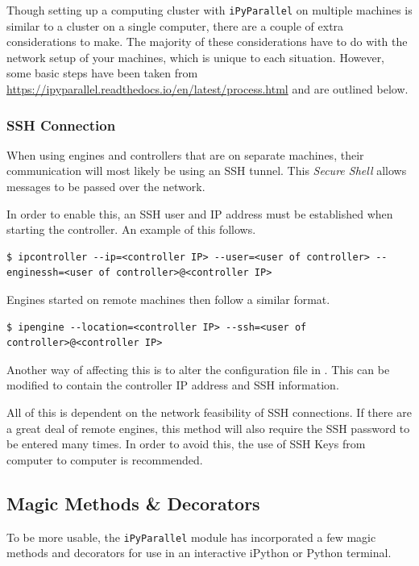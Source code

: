 Though setting up a computing cluster with \texttt{iPyParallel} on multiple machines is similar to a cluster on a single computer, there are a couple of extra considerations to make.
The majority of these considerations have to do with the network setup of your machines, which is unique to each situation.
However, some basic steps have been taken from \url{https://ipyparallel.readthedocs.io/en/latest/process.html} and are outlined below.

\subsubsection*{SSH Connection}
When using engines and controllers that are on separate machines, their communication will most likely be using an SSH tunnel.
This \emph{Secure Shell} allows messages to be passed over the network.

In order to enable this, an SSH user and IP address must be established when starting the controller.
An example of this follows.

\begin{lstlisting}[style=ShellInput]
$ ipcontroller --ip=<controller IP> --user=<user of controller> --enginessh=<user of controller>@<controller IP>
\end{lstlisting}

Engines started on remote machines then follow a similar format.

\begin{lstlisting}[style=ShellInput]
$ ipengine --location=<controller IP> --ssh=<user of controller>@<controller IP>
\end{lstlisting}

Another way of affecting this is to alter the configuration file in .
This can be modified to contain the controller IP address and SSH information.

All of this is dependent on the network feasibility of SSH connections.
If there are a great deal of remote engines, this method will also require the SSH password to be entered many times.
In order to avoid this, the use of SSH Keys from computer to computer is recommended.


\subsection*{Magic Methods \& Decorators}
To be more usable, the \texttt{iPyParallel} module has incorporated a few magic methods and decorators for use in an interactive iPython or Python terminal.

